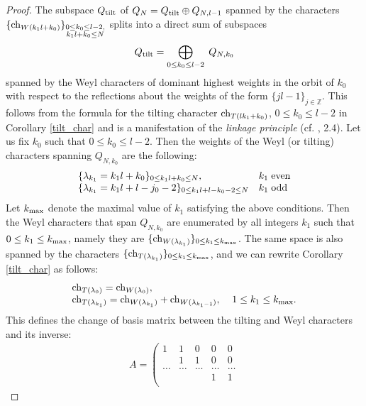 \documentclass[11pt]{amsart}
\newcommand{\Z}{\mathbb{Z}}
\begin{document}
\begin{proof}
The subspace $Q_{\rm tilt}$  of $Q_N= Q_{\rm tilt} \oplus Q_{N, l-1}$ spanned by the characters $\{{\rm ch}_{W(k_1l + k_0)} \}_{\substack{0 \leq k_0 \leq l-2,\\ k_1l + k_0 \leq N}}$ splits into a direct sum of subspaces 
\[ Q_{\rm tilt} =  \bigoplus_{0\leq k_0 \leq l-2} \; Q_{N, k_0} \] 
spanned by the Weyl characters of dominant highest weights in the orbit of $k_0$ with respect to the reflections about the weights of the form $\{ jl-1\}_{ j \in \Z}$. This follows from the formula for the tilting character ${\rm ch}_{T(lk_1 + k_0)}$, $0 \leq k_0 \leq l-2$ in Corollary \ref{tilt_char} and is a manifestation of the {\it linkage principle} (cf. \cite{AT}, 2.4). Let us fix $k_0$ such that  $0  \leq k_0 \leq l-2$. Then the weights of the Weyl (or tilting) characters spanning $Q_{N, k_0}$ are the following: 
\[  \begin{array}{ll} 
 \{ \lambda_{k_1} =   k_1 l + k_0 \}_{0 \leq k_1l + k_0 \leq N},   &    k_1   \; {\rm even}  \\
 \{ \lambda_{k_1} =  k_1 l + l-j_0 -2\}_{ 0 \leq  k_1 l + l - k_0 -2 \leq N}    &  k_1  \; {\rm odd} 
   \end{array}  \] 
   Let $k_{\rm max}$ denote the maximal value of $k_1$ satisfying the above conditions. Then  the Weyl characters that span $Q_{N, k_0}$ are enumerated by all integers $k_1$ such that $0 \leq k_1 \leq k_{\rm max}$, namely they are  
    $\{{\rm ch}_{W(\lambda_{k_1})} \}_{0 \leq k_1 \leq k_{\rm max}}$. 
The same space is also spanned by the characters  $\{ {\rm ch}_{T(\lambda_{k_1})} \}_{0 \leq k_1 \leq k_{\rm max}}$, and we can rewrite Corollary \ref{tilt_char} as follows:  
 \[\begin{array}{l} 
 {\rm ch}_{T(\lambda_0)} = {\rm ch}_{W(\lambda_0)} , \\ 
  {\rm ch}_{T(\lambda_{k_1})} = {\rm ch}_{W(\lambda_{k_1})} + {\rm ch}_{W(\lambda_{k_1-1})}   , \;\;\;\;  1 \leq k_1 \leq k_{\rm max}  . 
  \end{array}  \] 
  This defines the change of basis matrix between the tilting and Weyl characters and its inverse: 
  \[ \begin{array}{lll} 
  A = \left( \begin{array}{ccccc} 
              1 & 1 & 0 & 0 & 0 \\ 
                 & 1 & 1 & 0 & 0 \\ 
               \ldots  &   \ldots  &  \ldots & \ldots   & \ldots    \\
                 &    &    &  1  & 1  \\

\end{array}
\end{array}\]
\end{proof}
\end{document}
